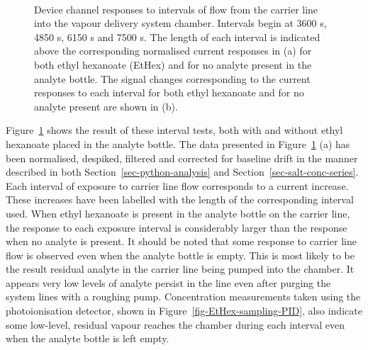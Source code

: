 \documentclass[
  a4paper,
]{scrbook}
\begin{document}
\begin{figure}
\begin{minipage}[t]{0.70\linewidth}
{}

\end{minipage}%
%
\begin{minipage}[t]{0.15\linewidth}

{\centering 

~

}

\end{minipage}%

\caption{\label{fig-EtHex-sampling}Device channel responses to intervals
of flow from the carrier line into the vapour delivery system chamber.
Intervals begin at 3600 s, 4850 s, 6150 s and 7500 s. The length of each
interval is indicated above the corresponding normalised current
responses in (a) for both ethyl hexanoate (EtHex) and for no analyte
present in the analyte bottle. The signal changes corresponding to the
current responses to each interval for both ethyl hexanoate and for no
analyte present are shown in (b).}

\end{figure}

Figure~\ref{fig-EtHex-sampling} shows the result of these interval
tests, both with and without ethyl hexanoate placed in the analyte
bottle. The data presented in Figure~\ref{fig-EtHex-sampling} (a) has
been normalised, despiked, filtered and corrected for baseline drift in
the manner described in both Section~\ref{sec-python-analysis} and
Section~\ref{sec-salt-conc-series}. Each interval of exposure to carrier
line flow corresponds to a current increase. These increases have been
labelled with the length of the corresponding interval used. When ethyl
hexanoate is present in the analyte bottle on the carrier line, the
response to each exposure interval is considerably larger than the
response when no analyte is present. It should be noted that some
response to carrier line flow is observed even when the analyte bottle
is empty. This is most likely to be the result residual analyte in the
carrier line being pumped into the chamber. It appears very low levels
of analyte persist in the line even after purging the system lines with
a roughing pump. Concentration measurements taken using the
photoionisation detector, shown in Figure~\ref{fig-EtHex-sampling-PID},
also indicate some low-level, residual vapour reaches the chamber during
each interval even when the analyte bottle is left empty.
\end{document}
